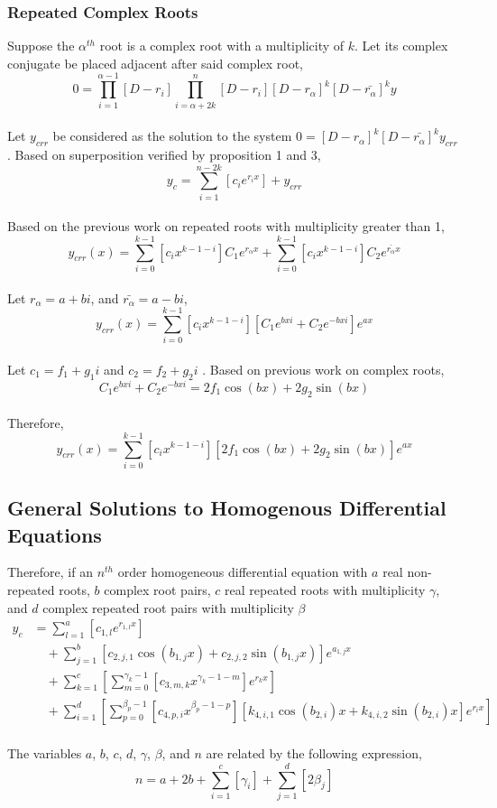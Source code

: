 \documentclass[a4paper, 12pt]{report}
\def\a{\alpha}
\def\be{\beta}
\def\g{\gamma}
\def\l{\left}
\def\r{\right}
\begin{document}
\begin{center}
\subsubsection{Repeated Complex Roots}
Suppose the $\a^{th}$ root is a complex root with a multiplicity of $k$. Let its complex conjugate be placed adjacent after said complex root,
$$0 = \prod_{i = 1}^{\a - 1}\l[D - r_i\r]\prod_{i = \a + 2k}^{n}\l[D - r_i\r]\l[D - r_{\a}\r]^{k}\l[D - \bar{r_{\a}}\r]^{k}y$$
\\Let $y_{crr}$ be considered as the solution to the system $0 = \l[D - r_{\a}\r]^{k}\l[D - \bar{r_{\a}}\r]^{k}y_{crr}$ . Based on superposition verified by proposition 1 and 3, 
$$y_c = \sum_{i = 1}^{n - 2k}\l[c_i e^{r_i x}\r] + y_{crr}$$
\\Based on the previous work on repeated roots with multiplicity greater than 1,
$$y_{crr}(x) = \sum_{i = 0}^{k - 1}\l[c_i x ^{k - 1 - i} \r] C_1 e^{r_\a x} + \sum_{i = 0}^{k - 1}\l[c_i x ^{k - 1 - i} \r] C_2 e^{\bar{r_\a} x}$$ 
\\Let $r_{\a} = a + bi$, and $\bar{r_\a} = a - bi$, 
$$y_{crr}(x) = \sum_{i = 0}^{k - 1}\l[c_i x ^{k - 1 - i} \r] [C_1 e^{bxi} + C_2 e^{-bxi}] e^{ax}$$
\\Let $c_{1} = f_1 + g_1 i$ and $c_{2} = f_2 + g_2 i$ . Based on previous work on complex roots,
$$C_1 e^{bxi} + C_2 e^{- bxi} = 2 f_1\cos{(bx)} + 2 g_2\sin{(bx)}$$
\\Therefore,
$$y_{crr}(x) = \sum_{i = 0}^{k - 1}\l[c_i x ^{k - 1 - i} \r] [2 f_1\cos{(bx)} + 2 g_2\sin{(bx)}] e^{ax}$$
\subsection{General Solutions to Homogenous Differential Equations}
Therefore, if an $n^{th}$ order homogeneous differential equation with $a$ real non-repeated roots, $b$ complex root pairs, $c$ real repeated roots with multiplicity $\g$, and $d$ complex repeated root pairs with multiplicity $\be$
\begin{align*}
y_c  &= \sum_{l =1}^{a}\l[c_{1,l}e^{r_{1,l}x}\r]\\ 
&\quad + \sum_{j =1}^{b}[c_{2,j,1} \cos{(b_{1,j} x)} + c_{2,j,2} \sin{(b_{1,j} x)}]e^{a_{1,j} x}\\ 
&\quad + \sum_{k =1}^{c}\l[\sum_{m = 0}^{\g_k - 1}\l[c_{3,m,k} x ^{\g_k - 1 - m} \r] e^{r_{k} x}\r]\\
&\quad + \sum_{i =1}^{d}\l[\sum_{p = 0}^{\be_p - 1}\l[c_{4,p,i} x ^{\be_p - 1 - p} \r][k_{4,i,1}\cos{(b_{2,i})x} + k_{4,i,2}\sin{(b_{2,i})x}] e^{r_{i} x}\r]
\end{align*}
\\The variables $a$, $b$, $c$, $d$, $\g$, $\be$, and $n$ are related by the following expression,
$$n = a + 2b + \sum_{i = 1}^{c}[\g_{i}] + \sum_{j = 1}^{d}[2\be_{j}]$$

\end{center}
\end{document}
